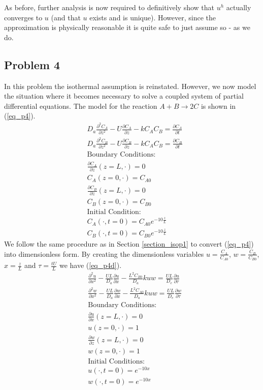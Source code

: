 \documentclass[11pt,fleqn]{article}
\theoremstyle{defstyle}
\begin{document}
As before, further analysis is now required to definitively show that $u^h$ actually converges to $u$ (and that $u$ exists and is unique). However, since the approximation is physically reasonable it is quite safe to just assume so - as we do.

\subsection{Problem 4}
In this problem the isothermal assumption is reinstated. However, we now model the situation where it becomes necessary to solve a coupled system of partial differential equations. The model for the reaction $A + B \rightarrow 2C$ is shown in (\ref{eq_p4}). 
\begin{equation}
\begin{aligned}
&D_a \frac{\partial^2 C_A}{\partial z^2} - U \frac{\partial C_A}{\partial z} - kC_AC_B 
= \frac{\partial C_A}{\partial t} \\
&D_a \frac{\partial^2 C_B}{\partial z^2} - U \frac{\partial C_B}{\partial z} - kC_AC_B 
= \frac{\partial C_B}{\partial t} \\
&\text{Boundary Conditions:} \\
&\frac{\partial C_A}{\partial z}(z=L, \cdot) = 0\\
&C_A(z=0, \cdot) = C_{A0} \\
&\frac{\partial C_B}{\partial z}(z=L, \cdot) = 0\\
&C_B(z=0, \cdot) = C_{B0} \\
&\text{Initial Condition:} \\
& C_A(\cdot, t= 0) = C_{A0}e^{-10\frac{z}{L}} \\
& C_B(\cdot, t= 0) = C_{B0}e^{-10\frac{z}{L}}
\end{aligned}
\label{eq_p4}
\end{equation}
We follow the same procedure as in Section \ref{section_isop1} to convert (\ref{eq_p4}) into dimensionless form. By creating the dimensionless variables $u=\frac{C_A}{C_{A0}}$, $w=\frac{C_B}{C_{B0}}$, $x = \frac{z}{L}$ and $\tau = \frac{tU}{L}$ we have (\ref{eq_p4d}).
\begin{equation}
\begin{aligned}
&\frac{\partial^2 u}{\partial x^2} - \frac{UL}{D_a} \frac{\partial u}{\partial x} - \frac{L^2C_{B0}}{D_a}kuw 
= \frac{UL}{D_e}\frac{\partial u}{\partial \tau} \\
&\frac{\partial^2 w}{\partial x^2} - \frac{UL}{D_a} \frac{\partial w}{\partial x} - \frac{L^2C_{A0}}{D_a}kuw 
= \frac{UL}{D_e}\frac{\partial w}{\partial \tau} \\
&\text{Boundary Conditions:} \\
&\frac{\partial u}{\partial x}(z=L, \cdot) = 0\\
&u(z=0, \cdot) = 1 \\
&\frac{\partial w}{\partial z}(z=L, \cdot) = 0\\
&w(z=0, \cdot) = 1 \\
&\text{Initial Conditions:} \\
& u(\cdot, t= 0) = e^{-10x} \\
& w(\cdot, t= 0) = e^{-10x}
\end{aligned}
\label{eq_p4d}
\end{equation}
\end{document}
